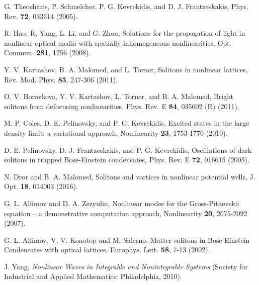 \documentclass[aps,preprint,showkeys,
]{revtex4}
\begin{document}
\begin{thebibliography}{99}
 G. Theocharis, P. Schmelcher, P. G. Kevrekidis, and D. J.
Frantzeskakis,
Phys. Rev. \textbf{72}, 033614 (2005).

 R. Hao, R, Yang, L. Li, and G. Zhou, Solutions for the
propagation of light in nonlinear optical media with spatially inhomogeneous
nonlinearities, Opt. Commun. \textbf{281}, 1256 (2008).

 Y. V. Kartashov, B. A. Malomed, and L. Torner, Solitons in
nonlinear lattices, Rev. Mod. Phys. \textbf{83}, 247-306 (2011).

 O. V. Borovkova, Y. V. Kartashov, L. Torner, and B. A.
Malomed, Bright solitons from defocusing nonlinearities, Phys. Rev. E
\textbf{84}, 035602 (R) (2011).

 M. P. Coles, D. E. Pelinovsky, and P. G. Kevrekidis, Excited
states in the large density limit: a variational approach, Nonlinearity
\textbf{23}, 1753-1770 (2010).

 D. E. Pelinovsky, D. J. Frantzeskakis, and P. G. Kevrekidis,
Oscillations of dark solitons in trapped Bose-Einstein condensates, Phys.
Rev. E \textbf{72}, 016615 (2005).

 N. Dror and B. A. Malomed, Solitons and vortices in nonlinear
potential wells, J. Opt. \textbf{18}, 014003 (2016).

 G. L. Alfimov and D. A. Zezyulin, Nonlinear modes for the
Gross-Pitaevskii equation -- a demonstrative computation approach,
Nonlinearity \textbf{20}, 2075-2092 (2007).


 G. L. Alfimov, V. V. Konotop and M. Salerno, Matter solitons
in Bose-Einstein Condensates with optical lattices, Europhys. Lett. \textbf{%
58}, 7-13 (2002).

 J. Yang, \textit{Nonlinear Waves in Integrable and
Nonintegrable Systems} (Society for Industrial and Applied Mathematics:
Philadelphia, 2010).


\end{thebibliography}
\end{document}

